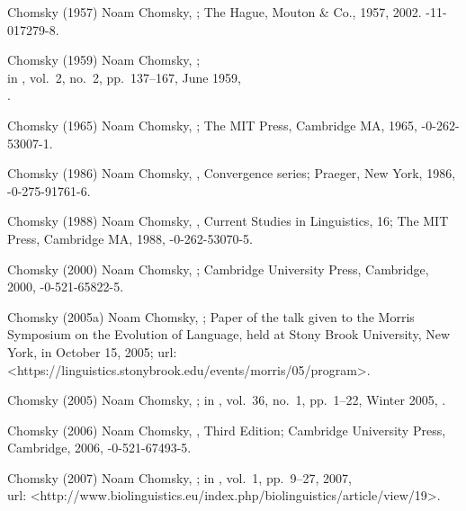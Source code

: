\biblabel Chomsky (1957)
Noam Chomsky,
;
The Hague, Mouton \& Co., 1957, 2002.
-11-017279-8.

\biblabel Chomsky (1959)
Noam Chomsky,
;\\
in ,
vol.\ 2, no.\ 2, pp.\ 137--167, June 1959,\\
.

\biblabel Chomsky (1965)
Noam Chomsky,
;
The MIT Press, Cambridge MA, 1965,
-0-262-53007-1.

\biblabel Chomsky (1986)
Noam Chomsky,
,
Convergence series;
Praeger, New York, 1986,
-0-275-91761-6.

\biblabel Chomsky (1988)
Noam Chomsky,
,
Current Studies in Linguistics, 16;
The MIT Press, Cambridge MA, 1988,
-0-262-53070-5.

\biblabel Chomsky (2000)
Noam Chomsky,
;
Cambridge University Press, Cambridge, 2000,
-0-521-65822-5.

\biblabel Chomsky (2005a)
Noam Chomsky,
;
Paper of the talk given to the
Morris Symposium on the Evolution of Language,
held at Stony Brook University, New York,
in October 15, 2005;
{\sc url:}
\URL<https://linguistics.stonybrook.edu/events/morris/05/program>.

\biblabel Chomsky (2005)
Noam Chomsky,
;
in ,
vol.\ 36, no.\ 1, pp.\ 1--22, Winter 2005,
.

\biblabel Chomsky (2006)
Noam Chomsky,
, Third Edition;
Cambridge University Press, Cambridge, 2006,
-0-521-67493-5.

\biblabel Chomsky (2007)
Noam Chomsky,
;
in ,
vol.\ 1, pp.\ 9--27, 2007,\\
{\sc url:}
\URL<http://www.biolinguistics.eu/index.php/biolinguistics/article/view/19>.


